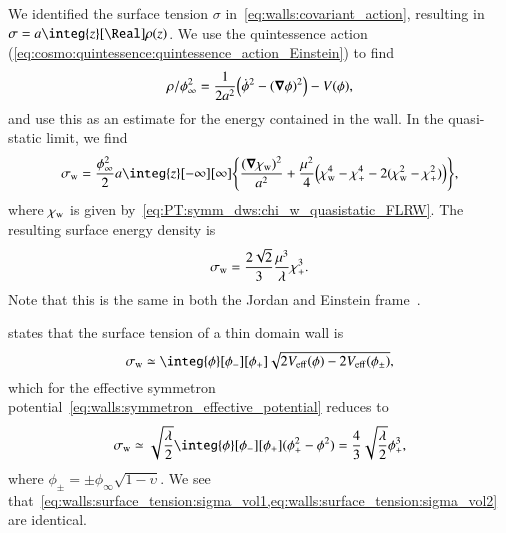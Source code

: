 





We identified the surface tension $\sigma$ in~\cref{eq:walls:covariant_action}, resulting in $\sigma = a \integ{z}[\Real] \rho(z) $. We use the quintessence action (\cref{eq:cosmo:quintessence:quintessence_action_Einstein}) to find~\citep{llinaresDomainWallsCoupled2014}
\begin{align}
    \rho/\phi_\infty^2 = \frac{1}{2a^2} {\left( \dot{\phi}^2 - {(\boldsymbol{\nabla}\phi)}^2 \right)} - V(\phi),
\end{align}
and use this as an estimate for the energy contained in the wall. %
In the quasi-static limit, we find
\begin{equation}
    \sigma\ped{w} = \frac{\phi_\infty^2 }{2}a \integ{z}[-\infty][\infty] \cclosed{
        \frac{{(\vec{\nabla}\chi\ped{w})}^2}{a^2} + \frac{\mu^2}{4} \pclosed{\chi\ped{w}^4 - \chi_+^4 - 2 (\chi\ped{w}^2-\chi_+^2)}
    },
\end{equation}
where $\chi_\mathrm{w}$ is given by~\cref{eq:PT:symm_dws:chi_w_quasistatic_FLRW}. The resulting surface energy density is 
\begin{equation}\label{eq:walls:surface_tension:sigma_vol1}
    \sigma_\mathrm{w} = \frac{2\sqrt{2}}{3} \frac{\mu^3}{\lambda} \chi_+^3.
\end{equation}
Note that this is the same in both the Jordan and Einstein frame~\citep{llinaresDomainWallsCoupled2014}.

\citet{christiansenGravitationalWavesDark2024} states that the surface tension of a thin domain wall is
\begin{equation}\label{eq:walls:surface_tension:sigma_V_eff}
    \sigma\ped{w} \simeq \integ{\phi}[\phi_-][\phi_+] \sqrt{ 2V\ped{eff}(\phi)-2V\ped{eff}(\phi_\pm) },
\end{equation}
which for the effective symmetron potential~\cref{eq:walls:symmetron_effective_potential}
reduces to 
\begin{equation}\label{eq:walls:surface_tension:sigma_vol2}
    \sigma\ped{w} \simeq  \sqrt{\frac{\lambda}{2}}\integ{\phi}[\phi_-][\phi_+]  (\phi_+^2 - \phi^2) = \frac{4}{3}\sqrt{\frac{\lambda}{2}} \phi_+^3,
\end{equation}
where $\phi_\pm = \pm \phi_\infty \sqrt{1-\upsilon}$. We see that~\cref{eq:walls:surface_tension:sigma_vol1,eq:walls:surface_tension:sigma_vol2} are identical.



